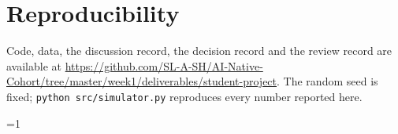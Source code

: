 \documentclass{article}
\def\usingijcai{1}
\def\usingijcai{0}
\begin{document}
\section*{Reproducibility}

Code, data, the discussion record, the decision record and the review record are available
at \url{https://github.com/SL-A-SH/AI-Native-Cohort/tree/master/week1/deliverables/student-project}. The
random seed is fixed; \texttt{python src/simulator.py} reproduces every number reported
here.

\ifnum\usingijcai=1\else\fi

\end{document}
